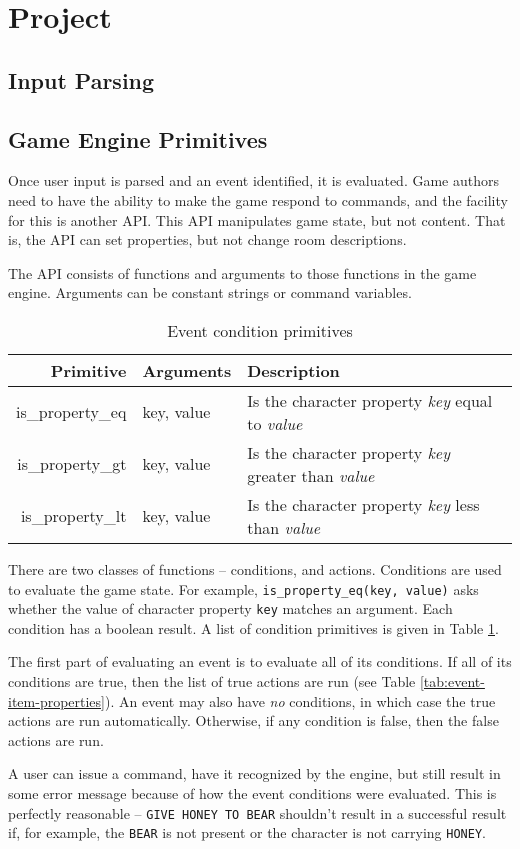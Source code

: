 \documentclass{article}
\newcommand{\enterProblemHeader}[1]{
}
\newcommand{\exitProblemHeader}[1]{
\nobreak\extramarks{#1}{}\nobreak
}
\newcounter{homeworkProblemCounter} %
\newcommand{\homeworkProblemName}{}
\newenvironment{homeworkProblem}[1][Problem \arabic{homeworkProblemCounter}]{ %
\stepcounter{homeworkProblemCounter} %
\renewcommand{\homeworkProblemName}{#1} %
\section{\homeworkProblemName} %
\enterProblemHeader{\homeworkProblemName} %
}{
\exitProblemHeader{\homeworkProblemName} %
}
\newcommand{\homeworkSectionName}{}
\newenvironment{homeworkSection}[1]{ %
\renewcommand{\homeworkSectionName}{#1} %
\subsection{\homeworkSectionName} %
\enterProblemHeader{\homeworkProblemName\ [\homeworkSectionName]} %
}{
\enterProblemHeader{\homeworkProblemName} %
}
\begin{document}
\begin{homeworkProblem}[Project]
\begin{homeworkSection}{Input Parsing}
\end{homeworkSection}

\begin{homeworkSection}{Game Engine Primitives}
	Once user input is parsed and an event identified, it is evaluated. Game authors need to have the ability to make the game respond to commands, and the facility for this is another API. This API manipulates game state, but not content. That is, the API can set properties, but not change room descriptions.

	The API consists of functions and arguments to those functions in the game engine. Arguments can be constant strings or command variables.

	\begin{table}
		\begin{tabularx}{\textwidth}{|r|l|X|}
			\hline
			Primitive & Arguments & Description \\
			\hline \hline
			is\_property\_eq & key, value & Is the character property \textit{key} equal to \textit{value} \\
			is\_property\_gt & key, value & Is the character property \textit{key} greater than \textit{value} \\
			is\_property\_lt & key, value & Is the character property \textit{key} less than \textit{value} \\
			\hline
		\end{tabularx}
		\caption{Event condition primitives}
		\label{tab:event-condition-primitives}
	\end{table}

	There are two classes of functions -- conditions, and actions. Conditions are used to evaluate the game state. For example, \texttt{is\_property\_eq(key, value)} asks whether the value of character property \texttt{key} matches an argument. Each condition has a boolean result. A list of condition primitives is given in Table \ref{tab:event-condition-primitives}.
	
	The first part of evaluating an event is to evaluate all of its conditions. If all of its conditions are true, then the list of true actions are run (see Table \ref{tab:event-item-properties}). An event may also have \textit{no} conditions, in which case the true actions are run automatically. Otherwise, if any condition is false, then the false actions are run.

	A user can issue a command, have it recognized by the engine, but still result in some error message because of how the event conditions were evaluated. This is perfectly reasonable -- \texttt{GIVE HONEY TO BEAR} shouldn't result in a successful result if, for example, the \texttt{BEAR} is not present or the character is not carrying \texttt{HONEY}.


\end{homeworkSection}
\end{homeworkProblem}
\end{document}
